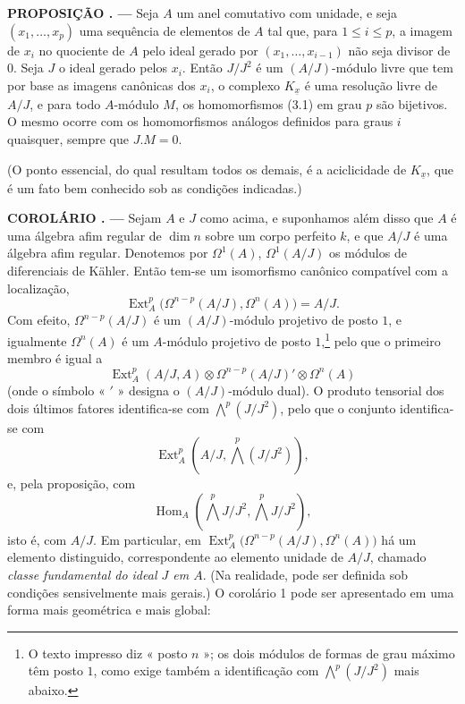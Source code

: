 \documentclass[11pt,twoside,openany]{book}
\numberwithin{equation}{section}
\newcommand{\src}[1]{%
  \phantomsection\hypertarget{src:#1}{}%
  \marginpar{\raggedleft\footnotesize\sffamily #1}%
}
\theoremstyle{plain}
\theoremstyle{definition}
\theoremstyle{remark}
\newcommand{\result}[2]{%
  \par\medskip\noindent\textbf{#1%
  \if\relax\detokenize{#2}\relax\else\space#2\fi. ---}\enspace
}
\newcommand{\FgaUnitKey}{frontmatter}
\renewcommand{\src}[1]{%
  \phantomsection\hypertarget{src:\FgaUnitKey:#1}{}%
  \marginpar{\raggedleft\footnotesize\sffamily #1}%
}
\begin{document}
\src{175}
\result{PROPOSIÇÃO}{4} Seja $A$ um anel comutativo com unidade, e seja
$(x_1,\ldots,x_p)$ uma sequência de elementos de $A$ tal que, para $1\leq i\leq p$,
a imagem de $x_i$ no quociente de $A$ pelo ideal gerado por
$(x_1,\ldots,x_{i-1})$ não seja divisor de $0$. Seja $J$ o ideal gerado
pelos $x_i$. Então $J/J^{2}$ é um $(A/J)$-módulo livre que tem por base as
imagens canônicas dos $x_i$, o complexo $K_{\underline{x}}$ é uma resolução
livre de $A/J$, e para todo $A$-módulo $M$, os homomorfismos (3.1) em
grau $p$ são bijetivos. O mesmo ocorre com os homomorfismos análogos
definidos para graus $i$ quaisquer, sempre que $J.M=0$.

(O ponto essencial, do qual resultam todos os demais, é a aciclicidade de
$K_{\underline{x}}$, que é um fato bem conhecido sob as condições indicadas.)

\result{COROLÁRIO}{1} Sejam $A$ e $J$ como acima, e suponhamos além disso que
$A$ é uma álgebra afim regular de $\dim n$ sobre um corpo perfeito $k$, e
que $A/J$ é uma álgebra afim regular. Denotemos por $\Omega^{1}(A)$,
$\Omega^{1}(A/J)$ os módulos de diferenciais de Kähler. Então tem-se um
isomorfismo canônico compatível com a localização,
\begin{equation}\tag{3.5}
  \operatorname{Ext}_{A}^{p}\bigl(\Omega^{n-p}(A/J),\Omega^{n}(A)\bigr)=A/J.
\end{equation}
Com efeito, $\Omega^{n-p}(A/J)$ é um $(A/J)$-módulo projetivo de posto $1$, e igualmente
$\Omega^{n}(A)$ é um $A$-módulo projetivo de posto $1$,\footnote{O texto impresso
diz « posto $n$ »; os dois módulos de formas de grau máximo têm posto
$1$, como exige também a identificação com $\bigwedge^{p}(J/J^{2})$ mais abaixo.}
pelo que o primeiro membro é igual a
\[
  \operatorname{Ext}_{A}^{p}(A/J,A)
  \otimes\Omega^{n-p}(A/J)'\otimes\Omega^{n}(A)
\]
(onde o símbolo « $'$ » designa o $(A/J)$-módulo dual). O produto tensorial dos
dois últimos fatores identifica-se com $\bigwedge^{p}(J/J^{2})$, pelo que o conjunto
identifica-se com
\[
  \operatorname{Ext}_{A}^{p}\!\left(A/J,\bigwedge^{p}(J/J^{2})\right),
\]
e, pela proposição, com
\[
  \operatorname{Hom}_{A}\!\left(\bigwedge^{p}J/J^{2},
  \bigwedge^{p}J/J^{2}\right),
\]
isto é, com $A/J$. Em particular, em
$\operatorname{Ext}_{A}^{p}\bigl(\Omega^{n-p}(A/J),\Omega^{n}(A)\bigr)$ há um
elemento distinguido, correspondente ao elemento unidade de $A/J$, chamado
\emph{classe fundamental do ideal $J$ em $A$}. (Na realidade, pode
ser definida sob condições sensivelmente mais gerais.) O
corolário 1 pode ser apresentado em uma forma mais geométrica e mais global:
\end{document}
